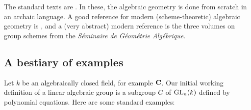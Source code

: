 The standard texts are \cite{borel-1991,humphreys-1975,springer-2009}. In 
these, the algebraic geometry is done from scratch in an archaic language. A 
good reference for modern (scheme-theoretic) algebraic geometry is 
\cite{hartshorne-1977}, and a (very abstract) modern reference is the 
three volumes on group schemes \cite{sga3-i,sga3-ii,sga3-iii} from the 
\emph{S\'eminaire de G\'eom\'etrie Alg\'ebrique}. 





\subsection{A bestiary of examples}

Let $k$ be an algebraically closed field, for example $\mathbf{C}$. Our initial 
working definition of a linear algebraic group is a subgroup $G$ of 
$\operatorname{GL}_n(k)$ defined by polynomial equations. Here are some standard examples:

